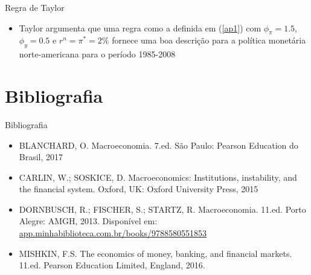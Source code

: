 \documentclass[10pt]{beamer}
\begin{document}
\begin{frame}{Regra de Taylor}
    \begin{itemize}
        \item Taylor argumenta que uma regra como a definida em (\ref{ap1}) com $\phi_\pi = 1.5$, $\phi_y = 0.5$ e $r^n = \pi^* = 2\%$ fornece uma boa descrição para a política monetária norte-americana para o período 1985-2008
        
        \hyperlink{voltar}{}
    \end{itemize}
    \end{frame}

\section{Bibliografia}
\begin{frame}{ Bibliografia}
    \begin{itemize}
        \item BLANCHARD, O. Macroeconomia. 7.ed. São Paulo: Pearson Education do Brasil, 2017\medskip        
        \item CARLIN, W.; SOSKICE, D. Macroeconomics: Institutions, instability, and the financial system. Oxford, UK: Oxford University Press, 2015\medskip
        \item DORNBUSCH, R.; FISCHER, S.; STARTZ, R. Macroeconomia. 11.ed. Porto Alegre: AMGH, 2013. Disponível em: \href{https://app.minhabiblioteca.com.br/books/9788580551853}{app.minhabiblioteca.com.br/books/9788580551853}\medskip
        \item MISHKIN, F.S. The economics of money, banking, and financial markets. 11.ed. Pearson Education Limited, England, 2016.
    \end{itemize}
\end{frame}
\end{document}
